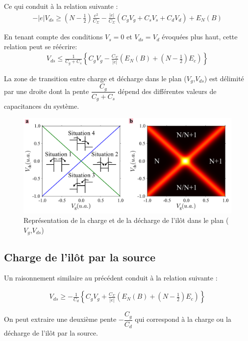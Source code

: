 Ce qui conduit à la relation suivante :
\begin{eqnarray}
-|e|V_{ds} \geq (N-\frac{1}{2})\frac{e^2}{C_{\Sigma}}
-
\frac{|e|}{C_{\Sigma}}(C_gV_g + C_sV_s + C_dV_d)
+
E_N(B) \nonumber
\end{eqnarray}

En tenant compte des conditions $V_s= 0$ et $V_{ds} = V_d$ évoquées plus haut, cette relation peut se réécrire:
\begin{eqnarray}
V_{ds} \leq \frac{1}{C_g + C_s} \left\lbrace C_gV_g - \frac{C_{\Sigma}}{|e|}\left(E_N(B) + (N-\frac{1}{2})E_c \right) \right\rbrace 
\end{eqnarray}

La zone de transition entre charge et décharge dans le plan ($V_g$,$V_{ds}$) est délimité par une droite dont la pente $\dfrac{C_g}{C_g + C_s}$ dépend des différentes valeurs de capacitances du système.


\begin{figure}
\includegraphics[scale=0.5]{Theorie/Transport/figure3/figure3.pdf} 
\caption{Représentation de la charge et de la décharge de l'il\^ot dans le plan ($V_g$,$V_{ds}$)}
\label{charge_discharge}
\end{figure}



\subsection{Charge de l'il\^ot par la source}
Un raisonnement similaire au précédent conduit à la relation suivante :

\begin{eqnarray}
V_{ds} \geq -\frac{1}{C_d} \left\lbrace C_gV_g + \frac{C_{\Sigma}}{|e|}\left( E_N(B) + (N-\frac{1}{2})E_c \right) \right\rbrace
\end{eqnarray}


On peut extraire une deuxième pente $-\dfrac{C_g}{C_d}$ qui correspond à la charge ou la décharge de l'il\^ot par la source.

